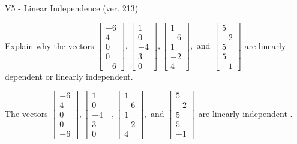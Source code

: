 \begin{exercise}
  \begin{exerciseTitle}V5 - Linear Independence (ver. 213)\end{exerciseTitle}
  \begin{exerciseStatement}
    Explain why the vectors \(\left[\begin{array}{r}
-6 \\
4 \\
0 \\
0 \\
-6
\end{array}\right] , \left[\begin{array}{r}
1 \\
0 \\
-4 \\
3 \\
0
\end{array}\right] , \left[\begin{array}{r}
1 \\
-6 \\
1 \\
-2 \\
4
\end{array}\right] , \text{ and } \left[\begin{array}{r}
5 \\
-2 \\
5 \\
5 \\
-1
\end{array}\right]\) are linearly dependent or linearly independent.	


  \end{exerciseStatement}
  \begin{exerciseAnswer}
   The vectors \(\left[\begin{array}{r}
-6 \\
4 \\
0 \\
0 \\
-6
\end{array}\right] , \left[\begin{array}{r}
1 \\
0 \\
-4 \\
3 \\
0
\end{array}\right] , \left[\begin{array}{r}
1 \\
-6 \\
1 \\
-2 \\
4
\end{array}\right] , \text{ and } \left[\begin{array}{r}
5 \\
-2 \\
5 \\
5 \\
-1
\end{array}\right]\) are 
  	 linearly independent  .
  


  \end{exerciseAnswer}
\end{exercise}